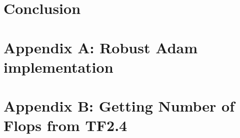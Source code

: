 \documentclass[journal]{IEEEtranTIE}
\begin{document}
\section{Conclusion} \label{sec:conclussion}





%
%
{
\clearpage
\appendices
\section{Appendix A: Robust Adam implementation}  \label{app:RoAdam}

\clearpage
\section{Appendix B: Getting Number of Flops from TF2.4}  \label{app:flops}

}
{}
\end{document}
